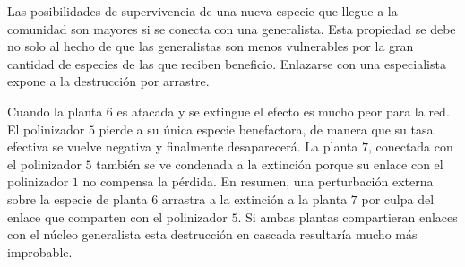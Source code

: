 Las posibilidades de supervivencia de una nueva especie que llegue a la comunidad son mayores si se conecta con una generalista. Esta propiedad se debe no solo al hecho de que las generalistas son menos vulnerables por la gran cantidad de especies de las que reciben beneficio. Enlazarse con una especialista expone a la destrucción por arrastre.

Cuando la planta $6$ es atacada y se extingue el efecto es mucho peor para la red. El polinizador $5$ pierde a su única especie benefactora, de manera que su tasa efectiva se vuelve negativa y finalmente desaparecerá. La planta $7$, conectada con el polinizador $5$ también se ve condenada a la extinción porque su enlace con el polinizador $1$ no compensa la pérdida. En resumen, una perturbación externa sobre la especie de planta $6$ arrastra a la extinción a la planta $7$ por culpa del enlace que comparten con el polinizador $5$. Si ambas plantas compartieran enlaces con el núcleo generalista esta destrucción en cascada resultaría mucho más improbable.

%
%
%
%
%

